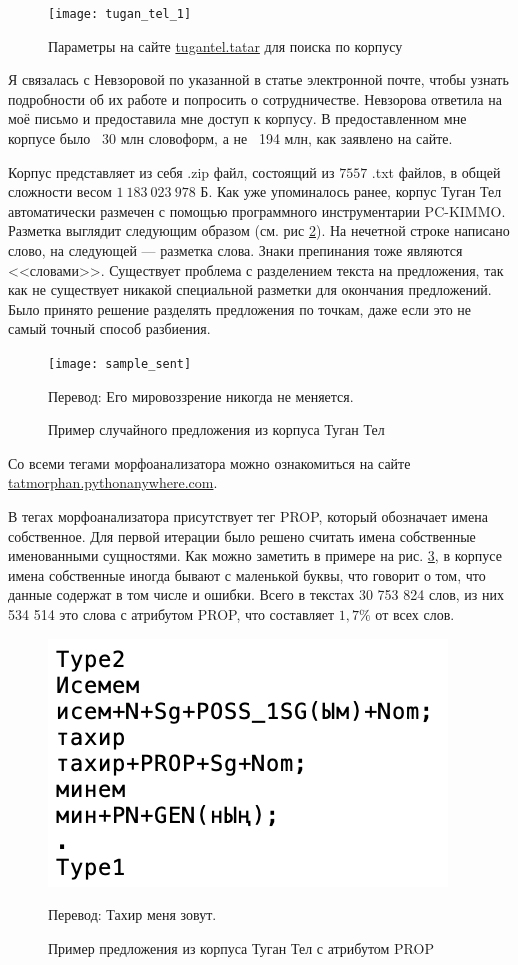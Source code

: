 \begin{figure}
\caption{Параметры на сайте \href{http://tugantel.tatar/}{tugantel.tatar} для поиска по корпусу}
\texttt{[image: tugan\_tel\_1]}
\label{fig:tugan_tel_1}
\end{figure}


Я связалась с Невзоровой по указанной в статье электронной почте, чтобы узнать подробности об их работе и попросить о сотрудничестве. Невзорова ответила на моё письмо и предоставила мне доступ к корпусу. В предоставленном мне корпусе было ~30 млн словоформ, а не ~194 млн, как заявлено на сайте. 

Корпус представляет из себя .zip файл, состоящий из $7557$ .txt файлов, в общей сложности весом $1\ 183\ 023\ 978$ Б. Как уже упоминалось ранее, корпус Туган Тел автоматически размечен с помощью программного инструментарии PC-KIMMO. Разметка выглядит следующим образом (см. рис \ref{fig:sample_sent}). На нечетной строке написано слово, на следующей --- разметка слова. Знаки препинания тоже являются <<словами>>. Существует проблема с разделением текста на предложения, так как не существует никакой специальной разметки для окончания предложений. Было принято решение разделять предложения по точкам, даже если это не самый точный способ разбиения.

\begin{figure}
\caption{Пример случайного предложения из корпуса Туган Тел}
\texttt{[image: sample\_sent]}
\label{fig:sample_sent}

Перевод: Его мировоззрение никогда не меняется.
\end{figure}

Со всеми тегами морфоанализатора можно ознакомиться на сайте \href{http://tatmorphan.pythonanywhere.com/morphan_tags}{tatmorphan.pythonanywhere.com}.

В тегах морфоанализатора присутствует тег PROP, который обозначает имена собственное. Для первой итерации было решено считать имена собственные именованными сущностями. Как можно заметить в примере на рис. \ref{fig:prop_sent}, в корпусе имена собственные иногда бывают с маленькой буквы, что говорит о том, что данные содержат в том числе и ошибки.
Всего в текстах 30 753 824 слов, из них 534 514 это слова с атрибутом PROP, что составляет $1,7\%$ от всех слов. 

\begin{figure}
\caption{Пример предложения из корпуса Туган Тел с атрибутом PROP}
\includegraphics{pics/prop_sent}
\label{fig:prop_sent}

Перевод: Тахир меня зовут.
\end{figure}

